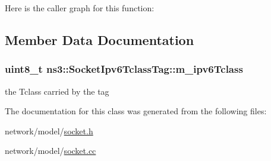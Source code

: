 Here is the caller graph for this function\+:




\subsection{Member Data Documentation}
\subsubsection[{\texorpdfstring{m\+\_\+ipv6\+Tclass}{m_ipv6Tclass}}]{\setlength{\rightskip}{0pt plus 5cm}uint8\+\_\+t ns3\+::\+Socket\+Ipv6\+Tclass\+Tag\+::m\+\_\+ipv6\+Tclass\hspace{0.3cm}{\ttfamily [private]}}\hypertarget{classns3_1_1SocketIpv6TclassTag_a9a690c967c431f0b6431e1127c9053de}{}\label{classns3_1_1SocketIpv6TclassTag_a9a690c967c431f0b6431e1127c9053de}


the Tclass carried by the tag 



The documentation for this class was generated from the following files\+:\begin{DoxyCompactItemize}
\item 
network/model/\hyperlink{socket_8h}{socket.\+h}\item 
network/model/\hyperlink{socket_8cc}{socket.\+cc}\end{DoxyCompactItemize}
